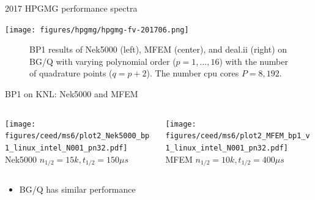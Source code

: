 \documentclass[aspectratio=169]{beamer}
\begin{document}
\begin{frame}{2017 HPGMG performance spectra}
  \begin{center}
    \vspace{-1em}
    \texttt{[image: figures/hpgmg/hpgmg-fv-201706.png]}
  \end{center}
\end{frame}

\begin{frame}
  \begin{figure} %
    \centering
    \caption{\label{bp1_bgq_xlc}BP1 results of Nek5000 (left), MFEM (center), and deal.ii (right)
      on BG/Q with varying polynomial order ($p=1,...,16$) with the number of
      quadrature points ($q=p+2$). The number cpu cores $P=8,192$.}
  \end{figure}
\end{frame}

\begin{frame}{BP1 on KNL: Nek5000 and MFEM}
  \begin{columns}
    \begin{column}{.5\textwidth}
      \texttt{[image: figures/ceed/ms6/plot2\_Nek5000\_bp1\_linux\_intel\_N001\_pn32.pdf]} \\
      Nek5000 $n_{1/2} = 15k, t_{1/2}= 150\mu s$
    \end{column}
    \begin{column}{.5\textwidth}
      \texttt{[image: figures/ceed/ms6/plot2\_MFEM\_bp1\_v1\_linux\_intel\_N001\_pn32.pdf]} \\
      MFEM $n_{1/2} = 10k, t_{1/2} = 400 \mu s$
    \end{column}
  \end{columns}
  \begin{itemize}
  \item BG/Q has similar performance
  \end{itemize}
\end{frame}
\end{document}
